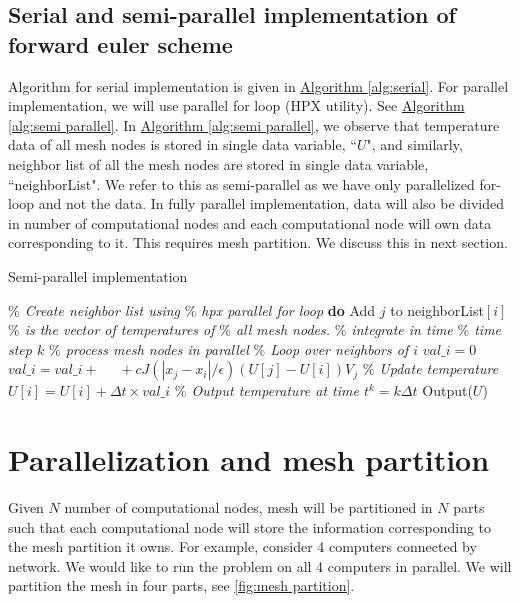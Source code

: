 \documentclass[11pt,twocolumn]{amsart}
\theoremstyle{definition}
\theoremstyle{definition}
\numberwithin{equation}{section}
\numberwithin{equation}{section}
\newcommand{\sref}[2]{\hyperref[#2]{#1 \ref*{#2}}}
\begin{document}
\subsection{Serial and semi-parallel implementation of forward euler scheme}
Algorithm for  serial implementation is given in \sref{Algorithm}{alg:serial}. For parallel implementation, we will use parallel for loop (HPX utility). See \sref{Algorithm}{alg:semi parallel}. In \sref{Algorithm}{alg:semi parallel}, we observe that temperature data of all mesh nodes is stored in single data variable, ``$U$", and similarly, neighbor list of all the mesh nodes are stored in single data variable, ``neighborList". We refer to this as semi-parallel as we have only parallelized for-loop and not the data. In fully parallel implementation, data will also be divided in number of computational nodes and each computational node will own data corresponding to it. This requires mesh partition. We discuss this in next section. 

\begin{algorithm}[ht]
	\caption{Semi-parallel implementation}
	\label{alg:semi parallel}
	\begin{algorithmic}[1]
		\STATE \textcolor{mygray}{\it $\%$ Create neighbor list using }
		\STATE \textcolor{mygray}{\it $\%$ hpx parallel for loop}
		 \textbf{do}
				\STATE Add $j$ to neighborList$[i]$
			\ENDIF
		\EndHloop
		\STATE
		\STATE \textcolor{mygray}{\it $\%$ is the vector of temperatures of}
		\STATE \textcolor{mygray}{\it $\%$ all mesh nodes. }
		\STATE
		\STATE \textcolor{mygray}{\it $\%$ integrate in time}
			\STATE \textcolor{mygray}{\it $\%$ time step $k$}
			\STATE \textcolor{mygray}{\it $\%$ process mesh nodes in parallel}
				\STATE  \textcolor{mygray}{\it $\%$ Loop over neighbors of $i$}
				\STATE $val\_i = 0$
					\STATE $val\_i = val\_i + $
					\STATE $\quad +  c J(|x_j - x_i|/\epsilon) (U[j] - U[i])V_j$
				\ENDFOR
				\STATE \textcolor{mygray}{\it $\%$ Update temperature}
				\STATE $U[i] = U[i] + \Delta t \times val\_i$
			\EndHloop	
			\STATE \textcolor{mygray}{\it $\%$ Output temperature at time $t^k = k\Delta t$}
			\STATE Output($U$)
		\ENDFOR
	\end{algorithmic}
\end{algorithm}

\section{Parallelization and mesh partition}
Given $N$ number of computational nodes, mesh will be partitioned in $N$ parts such that each computational node will store the information corresponding to the mesh partition it owns. For example, consider 4 computers connected by network. We would like to run the problem on all 4 computers in parallel. We will partition the mesh in four parts, see \autoref{fig:mesh partition}.
\end{document}
